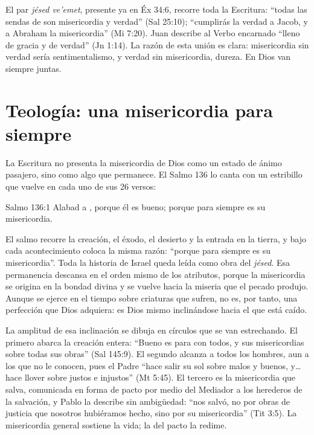 El par \emph{jésed ve'emet}, presente ya en Éx 34:6, recorre toda la Escritura: ``todas las sendas de \SENOR{} son misericordia y verdad'' (Sal 25:10); ``cumplirás la verdad a Jacob, y a Abraham la misericordia'' (Mi 7:20). Juan describe al Verbo encarnado ``lleno de gracia y de verdad'' (Jn 1:14). La razón de esta unión es clara: misericordia sin verdad sería sentimentalismo, y verdad sin misericordia, dureza. En Dios van siempre juntas.


\section{Teología: una misericordia para siempre}

La Escritura no presenta la misericordia de Dios como un estado de ánimo pasajero, sino como algo que permanece. El Salmo 136 lo canta con un estribillo que vuelve en cada uno de sus 26 versos:

\begin{verso}{Salmo 136:1}
Alabad a \SENOR, porque él es bueno; porque para siempre es su misericordia.
\end{verso}

El salmo recorre la creación, el éxodo, el desierto y la entrada en la tierra, y bajo cada acontecimiento coloca la misma razón: ``porque para siempre es su misericordia''. Toda la historia de Israel queda leída como obra del \emph{jésed}. Esa permanencia descansa en el orden mismo de los atributos, porque la misericordia se origina en la bondad divina y se vuelve hacia la miseria que el pecado produjo. Aunque se ejerce en el tiempo sobre criaturas que sufren, no es, por tanto, una perfección que Dios adquiera: es Dios mismo inclinándose hacia el que está caído.

La amplitud de esa inclinación se dibuja en círculos que se van estrechando. El primero abarca la creación entera: ``Bueno es \SENOR{} para con todos, y sus misericordias sobre todas sus obras'' (Sal 145:9). El segundo alcanza a todos los hombres, aun a los que no le conocen, pues el Padre ``hace salir su sol sobre malos y buenos, y\ldots{} hace llover sobre justos e injustos'' (Mt 5:45). El tercero es la misericordia que salva, comunicada en forma de pacto por medio del Mediador a los herederos de la salvación, y Pablo la describe sin ambigüedad: ``nos salvó, no por obras de justicia que nosotros hubiéramos hecho, sino por su misericordia'' (Tit 3:5). La misericordia general sostiene la vida; la del pacto la redime.

